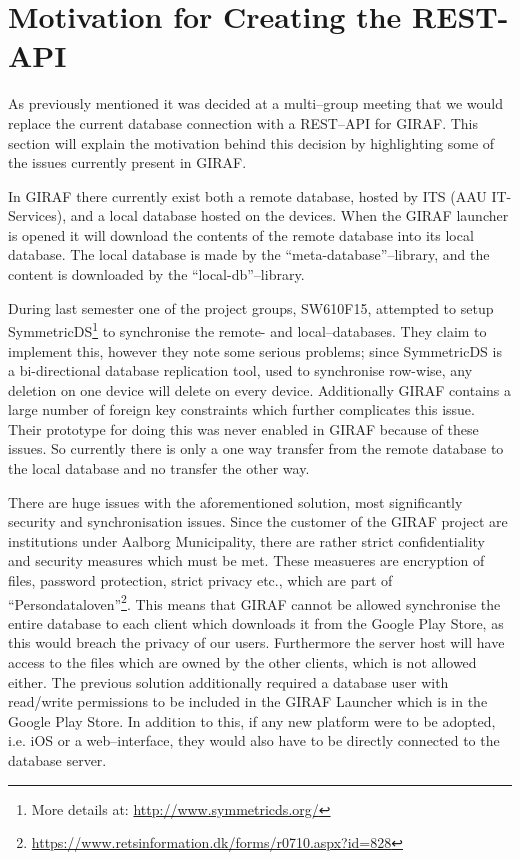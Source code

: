 \section{Motivation for Creating the REST-API} \label{sec:current} %
As previously mentioned it was decided at a multi--group meeting that we would replace the current database connection with a REST--API for GIRAF.
This section will explain the motivation behind this decision by highlighting some of the issues currently present in GIRAF.

In GIRAF there currently exist both a remote database, hosted by ITS (AAU IT-Services), and a local database hosted on the devices.
When the GIRAF launcher is opened it will download the contents of the remote database into its local database.
The local database is made by the ``meta-database''--library, and the content is downloaded by the ``local-db''--library.

During last semester one of the project groups, SW610F15, attempted to setup SymmetricDS\footnote{More details at: \url{http://www.symmetricds.org/}} to synchronise the remote- and local--databases.
They claim to implement this, however they note some serious problems; since SymmetricDS is a bi-directional database replication tool, used to synchronise row-wise, any deletion on one device will delete on every device. 
Additionally GIRAF contains a large number of foreign key constraints which further complicates this issue. 
Their prototype for doing this was never enabled in GIRAF because of these issues. 
So currently there is only a one way transfer from the remote database to the local database and no transfer the other way.

\bigskip
There are huge issues with the aforementioned solution, most significantly security and synchronisation issues. 
Since the customer of the GIRAF project are institutions under Aalborg Municipality, there are rather strict confidentiality and security measures which must be met.
These measueres are encryption of files, password protection, strict privacy etc., which are part of ``Persondataloven''\footnote{\url{https://www.retsinformation.dk/forms/r0710.aspx?id=828}}.
This means that GIRAF cannot be allowed synchronise the entire database to each client which downloads it from the Google Play Store, as this would breach the privacy of our users.
Furthermore the server host will have access to the files which are owned by the other clients, which is not allowed either.
The previous solution additionally required a database user with read/write permissions to be included in the GIRAF Launcher which is in the Google Play Store. 
In addition to this, if any new platform were to be adopted, i.e. iOS or a web--interface, they would also have to be directly connected to the database server. 

